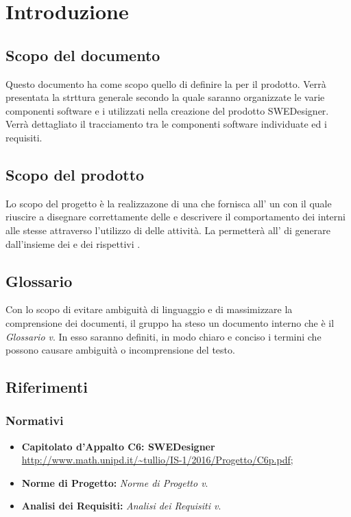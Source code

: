 \section{Introduzione}
\subsection{Scopo del documento}
Questo documento ha come scopo quello di definire la  per il prodotto. Verrà presentata la strttura generale secondo la quale saranno organizzate le varie componenti software e i  utilizzati nella creazione del prodotto SWEDesigner. Verrà dettagliato il tracciamento tra le componenti software individuate ed i requisiti. 
\subsection{Scopo del prodotto}
          Lo scopo del progetto è la realizzazone di una  che fornisca all' un   con il quale riuscire a disegnare correttamente  delle 
          e descrivere il comportamento dei  interni alle stesse attraverso l'utilizzo di  delle attività.
          La  permetterà all' di generare   dall'insieme dei  e dei rispettivi .
\subsection{Glossario}
          Con lo scopo di evitare ambiguità di linguaggio e di massimizzare la comprensione dei documenti, il
          gruppo ha steso un documento interno che è il \emph{Glossario v}\VersioneG{}. In esso saranno definiti, in modo
          chiaro e conciso i termini che possono causare ambiguità o incomprensione del testo.
\subsection{Riferimenti}
\subsubsection{Normativi}
\begin{itemize}
	\item \textbf{Capitolato d'Appalto C6: SWEDesigner} \\
		\url{http://www.math.unipd.it/~tullio/IS-1/2016/Progetto/C6p.pdf}; \\
	\item \textbf{Norme di Progetto:} \textit{Norme di Progetto v\VersioneNP}. \\
	
		\item \textbf{Analisi dei Requisiti:} \textit{Analisi dei Requisiti v\VersioneAR}. \\
\end{itemize}
